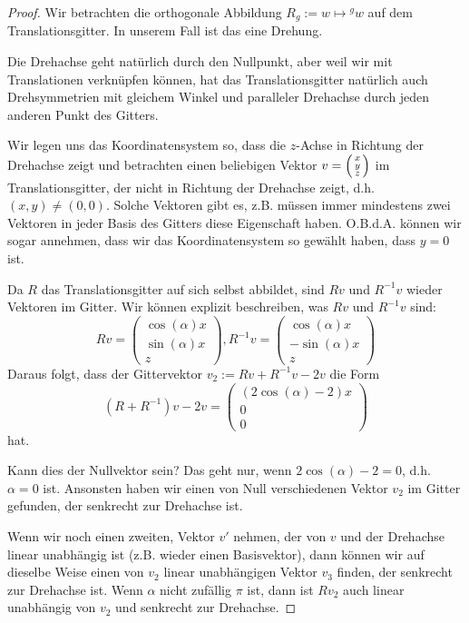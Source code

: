 \begin{proof}
Wir betrachten die orthogonale Abbildung $R_g:=w\mapsto{^g w}$ auf dem Translationsgitter. In unserem Fall ist das eine Drehung.

Die Drehachse geht natürlich durch den Nullpunkt, aber weil wir mit Translationen verknüpfen können, hat das Translationsgitter natürlich auch Drehsymmetrien mit gleichem Winkel und paralleler Drehachse durch jeden anderen Punkt des Gitters.

Wir legen uns das Koordinatensystem so, dass die $z$-Achse in Richtung der Drehachse zeigt und betrachten einen beliebigen Vektor $v=\begin{psmallmatrix}x\\y\\z\end{psmallmatrix}$ im Translationsgitter, der nicht in Richtung der Drehachse zeigt, d.h. $(x,y)\neq(0,0)$. Solche Vektoren gibt es, z.B. müssen immer mindestens zwei Vektoren in jeder Basis des Gitters diese Eigenschaft haben. O.B.d.A. können wir sogar annehmen, dass wir das Koordinatensystem so gewählt haben, dass $y=0$ ist.

\medbreak
Da $R$ das Translationsgitter auf sich selbst abbildet, sind $Rv$ und $R^{-1}v$ wieder Vektoren im Gitter. Wir können explizit beschreiben, was $Rv$ und $R^{-1}v$ sind:
\[Rv =\begin{pmatrix}\cos(\alpha)x\\\sin(\alpha)x\\z\end{pmatrix}, R^{-1}v =\begin{pmatrix}\cos(\alpha)x\\-\sin(\alpha)x\\z\end{pmatrix}\]
Daraus folgt, dass der Gittervektor $v_2:=Rv+R^{-1}v-2v$ die Form
\[(R+R^{-1})v-2v = \begin{pmatrix}(2\cos(\alpha)-2)x\\0\\0\end{pmatrix}\]
hat.

Kann dies der Nullvektor sein? Das geht nur, wenn $2\cos(\alpha)-2=0$, d.h. $\alpha=0$ ist. Ansonsten haben wir einen von Null verschiedenen Vektor $v_2$ im Gitter gefunden, der senkrecht zur Drehachse ist.

Wenn wir noch einen zweiten, Vektor $v'$ nehmen, der von $v$ und der Drehachse linear unabhängig ist (z.B. wieder einen Basisvektor), dann können wir auf dieselbe Weise einen von $v_2$ linear unabhängigen Vektor $v_3$ finden, der senkrecht zur Drehachse ist. Wenn $\alpha$ nicht zufällig $\pi$ ist, dann ist $Rv_2$ auch linear unabhängig von $v_2$ und senkrecht zur Drehachse.


\end{proof}

